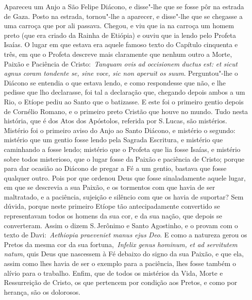 Apareceu um Anjo a São Felipe Diácono, e disse"-lhe que se
fosse pôr na estrada de Gaza. Posto na estrada, tornou"-lhe a aparecer, e
disse"-lhe que se chegasse a uma carroça que por ali passava. Chegou, e
viu que ia na carroça um homem preto (que era criado da Rainha de
Etiópia) e ouviu que ia lendo pelo Profeta Isaías. O lugar em que estava
era aquele famoso texto do Capítulo cinquenta e três, em que o Profeta
descreve mais claramente que nenhum outro a Morte, Paixão e Paciência de
Cristo:~\emph{Tanquam ovis ad occisionem ductus est: et sicut agnus
coram tondente se, sine voce, sic non aperuit os
suum}. Perguntou"-lhe o Diácono se entendia o que
estava lendo, e como respondesse que não, e lhe pedisse que lho
declarasse, foi tal a declaração que, chegando depois ambos a um Rio, o
Etíope pediu ao Santo que o batizasse. E este foi o primeiro gentio
depois de Cornélio Romano, e o primeiro preto Cristão que houve no
mundo. Tudo nesta história, que é dos Atos dos Apóstolos, referida por
S.\,Lucas, são mistérios. Mistério foi o primeiro aviso do Anjo ao Santo
Diácono, e mistério o segundo: mistério que um gentio fosse lendo pela
Sagrada Escritura, e mistério que caminhando a fosse lendo; mistério que
o Profeta que lia fosse Isaías, e mistério sobre todos misterioso, que o
lugar fosse da Paixão e paciência de Cristo; porque para dar ocasião ao
Diácono de pregar a Fé a um gentio, bastava que fosse qualquer outro.
Pois por que ordenou Deus que fosse sinaladamente aquele lugar, em que
se descrevia a sua Paixão, e os tormentos com que havia de ser
maltratado, e a paciência, sujeição e silêncio com que os havia de
suportar? Sem dúvida, porque neste primeiro Etíope tão antecipadamente
convertido se representavam todos os homens da sua cor, e da sua nação,
que depois se converteram. Assim o dizem S.\,Jerônimo e Santo Agostinho,
e o provam com o texto de Davi:~\emph{Aethiopia praeveniet manus ejus
Deo}. E como a natureza gerou os Pretos da mesma cor
da sua fortuna,~\emph{Infelix genus hominum, et ad servitutem
natum}, quis Deus que nascessem à Fé debaixo do signo
da sua Paixão, e que ela, assim como lhes havia de ser o exemplo para a
paciência, lhes fosse também o alívio para o trabalho. Enfim, que de
todos os mistérios da Vida, Morte e Ressurreição de Cristo, os que
pertencem por condição aos Pretos, e como por herança, são os dolorosos.


